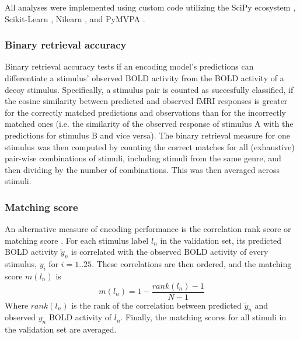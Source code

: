 All analyses were implemented using custom code utilizing the SciPy ecosystem \citep{jones2014scipy},
Scikit-Learn \citep{PVG+11}, Nilearn \citep{abraham2014machine}, and PyMVPA
\citep{HHS09b}.

%
%
\subsubsection*{Binary retrieval accuracy}
%
Binary retrieval accuracy \citep{ML08} tests if an encoding model's predictions
can differentiate a stimulus' observed BOLD activity from the BOLD activity of
a decoy stimulus.  Specifically, a stimulus pair is counted as succesfully
classified, if the cosine similarity between predicted and observed f{MRI}
responses is greater for the correctly matched predictions and observations
than for the incorrectly matched ones (i.e. the similarity of the observed
response of stimulus A with the predictions for stimulus B and vice versa).
The binary retrieval measure for one stimulus was then computed by counting the
correct matches for all (exhaustive) pair-wise combinations of stimuli, including
stimuli from the same genre, and then dividing by the number of combinations.
This was then averaged across stimuli.


\subsubsection*{Matching score}
%
An alternative measure of encoding performance is the correlation rank score or
matching score \citep{SF14}. For each stimulus label $l_{n}$ in the validation
set, its predicted BOLD activity $\widetilde{y}_{n}$ is correlated with the
observed BOLD activity of every stimulus, $y_{i}$ for $i=1..25$. These
correlations are then ordered, and the  matching score $m(l_{n})$ is \[
m(l_{n}) = 1-\frac{rank(l_{n})-1}{N-1} \] Where $rank(l_{n})$ is the rank of
the correlation between predicted $\widetilde{y}_{n}$ and observed $y_{n}$ BOLD
activity of $l_{n}$. Finally, the matching scores for all stimuli in the
validation set are averaged.


